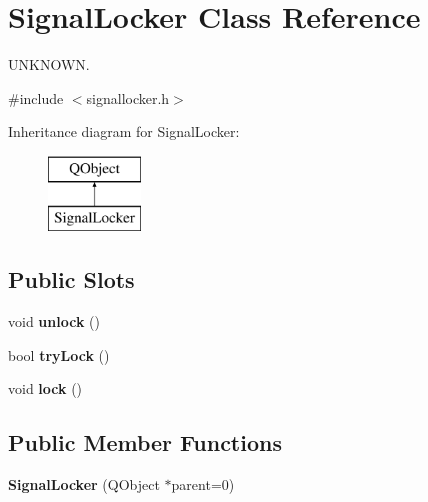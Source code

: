 \hypertarget{class_signal_locker}{}\section{Signal\+Locker Class Reference}
\label{class_signal_locker}


U\+N\+K\+N\+O\+W\+N.  




{\ttfamily \#include $<$signallocker.\+h$>$}

Inheritance diagram for Signal\+Locker\+:\begin{figure}[H]
\begin{center}
\leavevmode
\includegraphics[height=2.000000cm]{class_signal_locker}
\end{center}
\end{figure}
\subsection*{Public Slots}
\begin{DoxyCompactItemize}
\item 
\hypertarget{class_signal_locker_a9cc13c97b47bc5329eb87fbeb39c8c21}{}void {\bfseries unlock} ()\label{class_signal_locker_a9cc13c97b47bc5329eb87fbeb39c8c21}

\item 
\hypertarget{class_signal_locker_a4580211e877dc365f58523a887903f54}{}bool {\bfseries try\+Lock} ()\label{class_signal_locker_a4580211e877dc365f58523a887903f54}

\item 
\hypertarget{class_signal_locker_a0e083bc4b1d1a0eb2561c898357d79f5}{}void {\bfseries lock} ()\label{class_signal_locker_a0e083bc4b1d1a0eb2561c898357d79f5}

\end{DoxyCompactItemize}
\subsection*{Public Member Functions}
\begin{DoxyCompactItemize}
\item 
\hypertarget{class_signal_locker_a2fa8c9dc5a14f60e7c3851bca19b1ddc}{}{\bfseries Signal\+Locker} (Q\+Object $\ast$parent=0)\label{class_signal_locker_a2fa8c9dc5a14f60e7c3851bca19b1ddc}

\end{DoxyCompactItemize}
